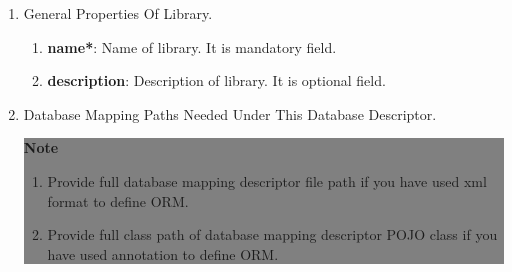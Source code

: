 \begin{enumerate}

	\item \small General Properties Of Library.
		
		\begin{enumerate}

			\item \small \textbf{name*}: Name of library. It is mandatory field.
			\item \small \textbf{description}: Description of library. It is optional field.
		
		\end{enumerate}

	\item \small Database Mapping Paths Needed Under This Database Descriptor.	

			\begin{center}
				\colorbox{grey}{
					\parbox[t]{.8\linewidth}{
						\fontsize{11pt}{11pt}\selectfont %
						\vspace*{0.1cm} %
		
						\hfill \textbf{Note} \\

						\hfill 

						\begin{enumerate}

							\item \small Provide full database mapping descriptor file path if you have used xml format to define ORM.

							\item \small Provide full class path of database mapping descriptor POJO class if you have used annotation to define ORM.
	
						\end{enumerate}

						\vspace*{0.0cm} %
					}
			}

			\end{center}

\end{enumerate}

